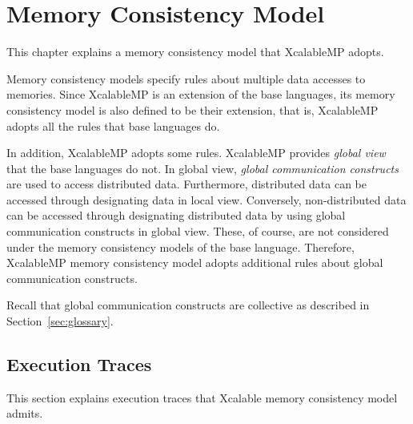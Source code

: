 

\chapter{Memory Consistency Model}

\newcommand{\Coloneqq}{\mathrel{\colon\!=}}
\newcommand{\xsync}{\texttt{xmp\_syn}}
\newcommand{\xasync}[1]{\texttt{xmp\_asyn}(#1)}
\newcommand{\waitasync}[1]{\texttt{wait\_async}(#1)}
\newcommand{\fstmt}{\texttt{f\_stmt}}
\newcommand{\F}[2]{\texttt{Fetch}^{#1} \: {#2}}
\newcommand{\E}[2]{\texttt{Execute}^{#1} \: {#2}}
\newcommand{\R}[2]{\texttt{Reflect}^{#1} \: {#2}}



This chapter explains a memory consistency model that XcalableMP adopts.

Memory consistency models specify rules about multiple data accesses
to memories.  Since XcalableMP is an extension of the base languages,
its memory consistency model is also defined to be their extension,
that is, XcalableMP adopts all the rules that base languages do.

In addition, XcalableMP adopts some rules.  XcalableMP provides
\emph{global view} that the base languages do not.  In global view,
\emph{global communication constructs} are used to access distributed
data.  Furthermore, distributed data can be accessed through
designating data in local view.  Conversely, non-distributed data can
be accessed through designating distributed data by using global
communication constructs in global view.  These, of course, are not
considered under the memory consistency models of the base language.
Therefore, XcalableMP memory consistency model adopts additional rules
about global communication constructs.

Recall that global communication constructs are collective as
described in Section~\ref{sec:glossary}.

\section{Execution Traces}

This section explains execution traces that Xcalable memory
consistency model admits.


